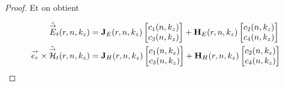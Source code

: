 \begin{proof}
    Et on obtient

    \begin{subequations}
      \label{eq:imp_fourier:cylindre:champs}
      \begin{align}
        \label{eq:imp_fourier:cylindre:champs:E}
        \hat {{\overset{\rightarrow}{E}}}_t(r,n,k_z) &= \mathbf{J}_{E}(r,n,k_z)
        \begin{bmatrix}
          c_1(n,k_z) \\
          c_3(n,k_z)
        \end{bmatrix}
        +
        \mathbf{H}_{E}(r,n,k_z)
        \begin{bmatrix}
          c_2(n,k_z) \\
          c_4(n,k_z)
        \end{bmatrix}
        \\
        \label{eq:imp_fourier:cylindre:champs:H}
        {\overset{\rightarrow}{e_r}}\times\hat {{\overset{\rightarrow}{\mathcal{H}}}}_t(r,n,k_z) &=
        \mathbf{J}_{H}(r,n,k_z)
        \begin{bmatrix}
          c_1(n,k_z) \\
          c_3(n,k_z)
        \end{bmatrix}
        +
        \mathbf{H}_{H}(r,n,k_z)
        \begin{bmatrix}
          c_2(n,k_z) \\
          c_4(n,k_z)
        \end{bmatrix}
      \end{align}
    \end{subequations}




\end{proof}
